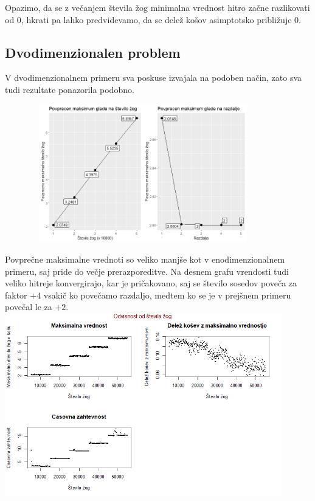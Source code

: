 \documentclass[a4paper, 11pt]{article}
\begin{document}
Opazimo, da se z večanjem števila žog minimalna vrednost hitro začne razlikovati od 0, hkrati pa lahko predvidevamo, da se delež košov asimptotsko približuje $0$. 
\bigbreak

\subsection{Dvodimenzionalen problem}
V dvodimenzionalnem primeru sva poskuse izvajala na podoben način, zato sva tudi rezultate ponazorila podobno.

\includegraphics[width=12cm, height=6cm]{povprecje_2dim1.png}

Povprečne maksimalne vrednoti so veliko manjše kot v enodimenzionalnem primeru, saj pride do večje prerazporeditve. Na desnem grafu vrendosti tudi veliko hitreje konvergirajo, kar je pričakovano, saj se število sosedov poveča za faktor $+4$ vsakič ko povečamo razdaljo, 
medtem ko se je v prejšnem primeru povečal le za $+2$.
\bigbreak
\includegraphics[width=12cm, height= 8cm]{dim2_glede_na_stevilo_zog1.png}
\end{document}
